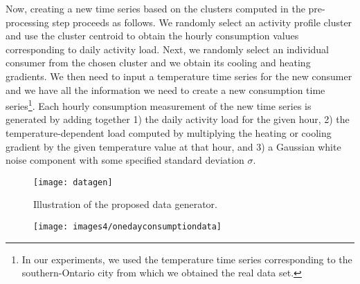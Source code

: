 \documentclass[prodmode,acmtods]{acmsmall}
\begin{document}
Now, creating a new time series based on the clusters computed in the pre-processing step proceeds as follows.  We randomly select an activity profile cluster and use the cluster centroid to obtain the hourly consumption values corresponding to daily activity load.  Next, we randomly select an individual consumer from the chosen cluster and we obtain its cooling and heating gradients.  We then need to input a temperature time series for the new consumer and we have all the information we need to create a new consumption time series\footnote{In our experiments, we used the temperature time series corresponding to the southern-Ontario city from which we obtained the real data set.}.  Each hourly consumption measurement of the new time series is generated by adding together 1) the daily activity load for the given hour, 2) the temperature-dependent load computed by multiplying the heating or cooling gradient by the given temperature value at that hour, and 3) a Gaussian white noise component with some specified standard deviation $\sigma$.

\begin{figure*}[t] 
  \centering
 \texttt{[image: datagen]}
 \vspace{-60pt}
  \caption{Illustration of the proposed data generator.}
  \label{fig:datagen} 
\end{figure*}


\begin{figure}[t]
\centering
\texttt{[image: images4/onedayconsumptiondata]}
\caption{}
\label{fig:onedayconsumptiondata} 
\end{figure}
\end{document}
